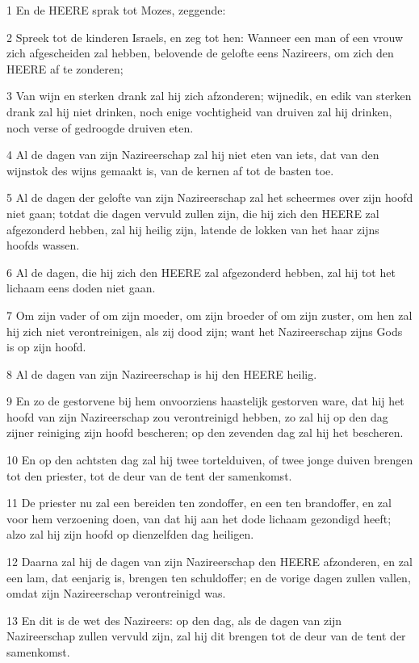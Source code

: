 \par 1 En de HEERE sprak tot Mozes, zeggende:
\par 2 Spreek tot de kinderen Israels, en zeg tot hen: Wanneer een man of een vrouw zich afgescheiden zal hebben, belovende de gelofte eens Nazireers, om zich den HEERE af te zonderen;
\par 3 Van wijn en sterken drank zal hij zich afzonderen; wijnedik, en edik van sterken drank zal hij niet drinken, noch enige vochtigheid van druiven zal hij drinken, noch verse of gedroogde druiven eten.
\par 4 Al de dagen van zijn Nazireerschap zal hij niet eten van iets, dat van den wijnstok des wijns gemaakt is, van de kernen af tot de basten toe.
\par 5 Al de dagen der gelofte van zijn Nazireerschap zal het scheermes over zijn hoofd niet gaan; totdat die dagen vervuld zullen zijn, die hij zich den HEERE zal afgezonderd hebben, zal hij heilig zijn, latende de lokken van het haar zijns hoofds wassen.
\par 6 Al de dagen, die hij zich den HEERE zal afgezonderd hebben, zal hij tot het lichaam eens doden niet gaan.
\par 7 Om zijn vader of om zijn moeder, om zijn broeder of om zijn zuster, om hen zal hij zich niet verontreinigen, als zij dood zijn; want het Nazireerschap zijns Gods is op zijn hoofd.
\par 8 Al de dagen van zijn Nazireerschap is hij den HEERE heilig.
\par 9 En zo de gestorvene bij hem onvoorziens haastelijk gestorven ware, dat hij het hoofd van zijn Nazireerschap zou verontreinigd hebben, zo zal hij op den dag zijner reiniging zijn hoofd bescheren; op den zevenden dag zal hij het bescheren.
\par 10 En op den achtsten dag zal hij twee tortelduiven, of twee jonge duiven brengen tot den priester, tot de deur van de tent der samenkomst.
\par 11 De priester nu zal een bereiden ten zondoffer, en een ten brandoffer, en zal voor hem verzoening doen, van dat hij aan het dode lichaam gezondigd heeft; alzo zal hij zijn hoofd op dienzelfden dag heiligen.
\par 12 Daarna zal hij de dagen van zijn Nazireerschap den HEERE afzonderen, en zal een lam, dat eenjarig is, brengen ten schuldoffer; en de vorige dagen zullen vallen, omdat zijn Nazireerschap verontreinigd was.
\par 13 En dit is de wet des Nazireers: op den dag, als de dagen van zijn Nazireerschap zullen vervuld zijn, zal hij dit brengen tot de deur van de tent der samenkomst.
